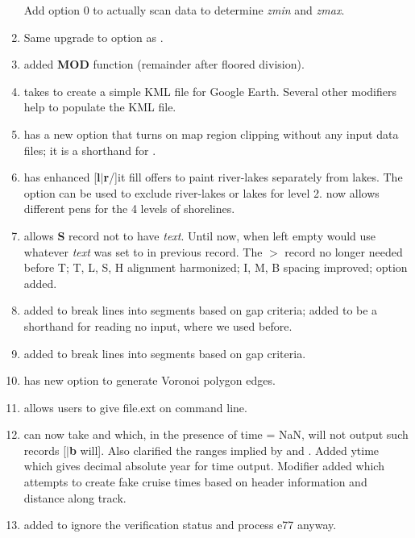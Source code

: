\begin{enumerate}
		Add option 0 to actually scan data to determine {\it zmin} and {\it zmax}.
	\item {} Same upgrade to  option as .
	\item {} added {\bf MOD} function (remainder after floored division).
	\item {} takes  to create a simple KML file for Google Earth.  Several
		other modifiers help to populate the KML file.
	\item {} has a new option  that turns on map region clipping without any
		input data files; it is a shorthand for  .
	\item {} has enhanced [{\bf l}$|${\bf r}/]{it fill} offers to paint river-lakes separately from lakes.
		The  option can be used to exclude river-lakes or lakes for level 2.
		 now allows different pens for the 4 levels of shorelines.
	\item {} allows {\bf S} record not to have {\it text}. Until now, when left empty would
		use whatever {\it text} was set to in previous record.  The $>$ record no longer needed before T;
		T, L, S, H alignment harmonized; I, M, B spacing improved;  option added.
	\item {} added  to break lines into segments based on gap criteria;
		added  to be a shorthand for reading no input, where we used  before.
	\item {} added  to break lines into segments based on gap criteria.
	\item {} has new option  to generate Voronoi polygon edges.
	\item {} allows users to give file.ext on command line.
	\item {} can now take  and  which, in the presence of time = NaN,
		will not output such records [$|${\bf b} will].  Also clarified the ranges implied by  and .
		Added ytime which gives decimal absolute year for time output.
		Modifier  added which attempts to create fake cruise times
		based on header information and distance along track.
	\item {} added  to ignore the verification status and process e77 anyway.

\end{enumerate}
